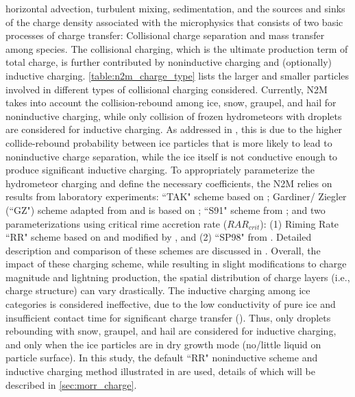  horizontal advection, turbulent mixing, sedimentation, and the sources and sinks of the charge density associated with the microphysics that consists of two basic processes of charge transfer: Collisional charge separation and mass transfer among species. The collisional charging, which is the ultimate production term of total charge, is further contributed by noninductive charging and (optionally) inductive charging. \ref{table:n2m_charge_type} lists the larger and smaller particles involved in different types of collisional charging considered. Currently, N2M takes into account the collision-rebound among ice, snow, graupel, and hail for noninductive charging, while only collision of frozen hydrometeors with droplets are considered for inductive charging. As addressed in \cite{mansell2005charge}, this is due to the higher collide-rebound probability between ice particles that is more likely to lead to noninductive charge separation, while the ice itself is not conductive enough to produce significant inductive charging.  To appropriately parameterize the hydrometeor charging and define the necessary coefficients, the N2M relies on results from laboratory experiments: ``TAK" scheme based on \cite{takahashi1978riming}; Gardiner/ Ziegler (``GZ") scheme adapted from \cite{ziegler1991model} and is based on \cite{gardiner1985measurements}; ``S91" scheme from \cite{saunders1991effect}; and two parameterizations using critical rime accretion rate ($RAR_{crit}$): (1) Riming Rate ``RR" scheme based on \cite{brooks1997effect} and modified by \cite{saunders1998laboratory}, and (2) ``SP98" from \cite{saunders1998laboratory}. Detailed description and comparison of these schemes are discussed in \cite{mansell2005charge}. Overall, the impact of these charging scheme, while resulting in slight modifications to charge magnitude and lightning production, the spatial distribution of charge layers (i.e., charge structure) can vary drastically. The inductive charging among ice categories is considered ineffective, due to the low conductivity of pure ice and insufficient contact time for significant charge transfer (\cite{latham1962electrical}). Thus, only droplets rebounding with snow, graupel, and hail are considered for inductive charging, and only when the ice particles are in dry growth mode (no/little liquid on particle surface). In this study, the default ``RR" noninductive scheme and inductive charging method illustrated in \cite{ziegler1991model} are used, details of which will be described in \ref{sec:morr_charge}.
